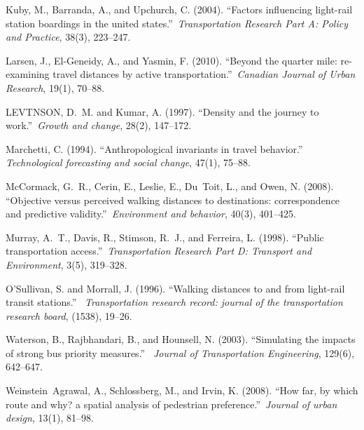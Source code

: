 \documentclass[sustainability,article,submit,moreauthors,pdftex,10pt,a4paper]{Definitions/mdpi}
\begin{document}
\begin{thebibliography}{999}
	Kuby, M., Barranda, A., and Upchurch, C. (2004).
	\newblock ``Factors influencing light-rail station boardings in the united
	states.''\ {\em Transportation Research Part A: Policy and Practice}, 38(3),
	223--247.
	
	Larsen, J., El-Geneidy, A., and Yasmin, F. (2010).
	\newblock ``Beyond the quarter mile: re-examining travel distances by active
	transportation.''\ {\em Canadian Journal of Urban Research}, 19(1), 70--88.
	
	LEVTNSON, D.~M. and Kumar, A. (1997).
	\newblock ``Density and the journey to work.''\ {\em Growth and change}, 28(2),
	147--172.
	
	Marchetti, C. (1994).
	\newblock ``Anthropological invariants in travel behavior.''\ {\em
		Technological forecasting and social change}, 47(1), 75--88.
	
	McCormack, G.~R., Cerin, E., Leslie, E., Du~Toit, L., and Owen, N. (2008).
	\newblock ``Objective versus perceived walking distances to destinations:
	correspondence and predictive validity.''\ {\em Environment and behavior},
	40(3), 401--425.
	
	Murray, A.~T., Davis, R., Stimson, R.~J., and Ferreira, L. (1998).
	\newblock ``Public transportation access.''\ {\em Transportation Research Part
		D: Transport and Environment}, 3(5), 319--328.
	
	O'Sullivan, S. and Morrall, J. (1996).
	\newblock ``Walking distances to and from light-rail transit stations.''\ {\em
		Transportation research record: journal of the transportation research
		board}, (1538), 19--26.
	
	Waterson, B., Rajbhandari, B., and Hounsell, N. (2003).
	\newblock ``Simulating the impacts of strong bus priority measures.''\ {\em
		Journal of Transportation Engineering}, 129(6), 642--647.
	
	Weinstein~Agrawal, A., Schlossberg, M., and Irvin, K. (2008).
	\newblock ``How far, by which route and why? a spatial analysis of pedestrian
	preference.''\ {\em Journal of urban design}, 13(1), 81--98.
	

\end{thebibliography}
\end{document}

